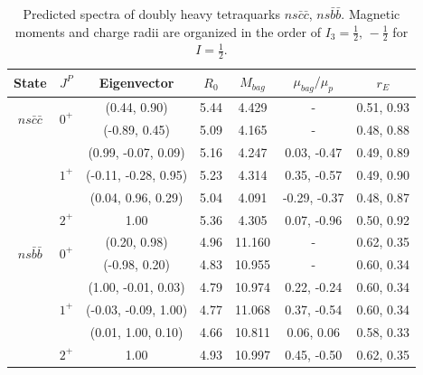 \documentclass[prd,twocolumn,floatfix,nofootinbib]{revtex4}
\begin{document}
\renewcommand{\tabcolsep}{0.74cm}
\renewcommand{\arraystretch}{1.3}
\begin{table}[!htbp]
    \caption{Predicted spectra of doubly heavy tetraquarks $ns\bar{c}\bar{c}$, $ns\bar{b}\bar{b}$. 
    Magnetic moments and charge radii are organized in the order of $I_{3}=\frac{1}{2},\,-\frac{1}{2}$ for $I=\frac{1}{2}$.}
    \label{tab:2heavytetraquark1/2}
    \begin{tabular}{ccccccc}
        \hline\hline
        {\rm State}     &$J^{P}$    &{\rm Eigenvector}      &$R_{0}$    &$M_{bag}$  &$\mu_{bag}/\mu_{p}$    &$r_{E}$ \\ \hline
        \multirow{2}{*}{$ns\bar{c}\bar{c}$}
                        &\multirow{2}{*}{$0^{+}$}
                                    &(0.44, 0.90)           &5.44	    &4.429	    &-                      &0.51, 0.93 \\ 
                        &           &(-0.89, 0.45)          &5.09	    &4.165	    &-                      &0.48, 0.88 \\ 
                        &\multirow{3}{*}{$1^{+}$}
                                    &(0.99, -0.07, 0.09)    &5.16	    &4.247	    &0.03, -0.47            &0.49, 0.89 \\ 
                        &           &(-0.11, -0.28, 0.95)   &5.23	    &4.314	    &0.35, -0.57            &0.49, 0.90 \\ 
                        &           &(0.04, 0.96, 0.29)     &5.04	    &4.091	    &-0.29, -0.37           &0.48, 0.87 \\ 
                        &$2^{+}$    &1.00                   &5.36	    &4.305	    &0.07, -0.96            &0.50, 0.92 \\ 
        \multirow{2}{*}{$ns\bar{b}\bar{b}$}             
                        &\multirow{2}{*}{$0^{+}$}             
                                    &(0.20, 0.98)           &4.96	    &11.160	    &-                      &0.62, 0.35 \\ 
                        &           &(-0.98, 0.20)          &4.83	    &10.955	    &-                      &0.60, 0.34 \\ 
                        &\multirow{3}{*}{$1^{+}$}
                                    &(1.00, -0.01, 0.03)    &4.79	    &10.974	    &0.22, -0.24            &0.60, 0.34 \\ 
                        &           &(-0.03, -0.09, 1.00)   &4.77	    &11.068	    &0.37, -0.54            &0.60, 0.34 \\ 
                        &           &(0.01, 1.00, 0.10)     &4.66	    &10.811	    &0.06, 0.06             &0.58, 0.33 \\ 
                        &$2^{+}$    &1.00                   &4.93	    &10.997	    &0.45, -0.50            &0.62, 0.35 \\ 
        \hline\hline
    \end{tabular}
\end{table}
\end{document}

